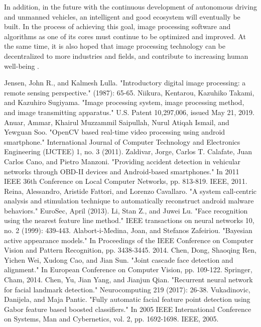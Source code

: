 \documentclass[12pt, a4paper]{article}
\begin{document}
In addition, in the future with the continuous development of autonomous driving and unmanned vehicles, an intelligent and good ecosystem will eventually be built. In the process of achieving this goal, image processing software and algorithms as one of its cores must continue to be optimized and improved. At the same time, it is also hoped that image processing technology can be decentralized to more industries and fields, and contribute to increasing human well-being .

\begin{thebibliography}{9}
 Jensen, John R., and Kalmesh Lulla. "Introductory digital image processing: a remote sensing perspective." (1987): 65-65.
 Niikura, Kentarou, Kazuhiko Takami, and Kazuhiro Sugiyama. "Image processing system, image processing method, and image transmitting apparatus." U.S. Patent 10,297,006, issued May 21, 2019.
 Anuar, Ammar, Khairul Muzzammil Saipullah, Nurul Atiqah Ismail, and Yewguan Soo. "OpenCV based real-time video processing using android smartphone." International Journal of Computer Technology and Electronics Engineering (IJCTEE) 1, no. 3 (2011).
 Zaldivar, Jorge, Carlos T. Calafate, Juan Carlos Cano, and Pietro Manzoni. "Providing accident detection in vehicular networks through OBD-II devices and Android-based smartphones." In 2011 IEEE 36th Conference on Local Computer Networks, pp. 813-819. IEEE, 2011.
 Reina, Alessandro, Aristide Fattori, and Lorenzo Cavallaro. "A system call-centric analysis and stimulation technique to automatically reconstruct android malware behaviors." EuroSec, April (2013).
 Li, Stan Z., and Juwei Lu. "Face recognition using the nearest feature line method." IEEE transactions on neural networks 10, no. 2 (1999): 439-443.
 Alabort-i-Medina, Joan, and Stefanos Zafeiriou. "Bayesian active appearance models." In Proceedings of the IEEE Conference on Computer Vision and Pattern Recognition, pp. 3438-3445. 2014.
 Chen, Dong, Shaoqing Ren, Yichen Wei, Xudong Cao, and Jian Sun. "Joint cascade face detection and alignment." In European Conference on Computer Vision, pp. 109-122. Springer, Cham, 2014.
 Chen, Yu, Jian Yang, and Jianjun Qian. "Recurrent neural network for facial landmark detection." Neurocomputing 219 (2017): 26-38.
 Vukadinovic, Danijela, and Maja Pantic. "Fully automatic facial feature point detection using Gabor feature based boosted classifiers." In 2005 IEEE International Conference on Systems, Man and Cybernetics, vol. 2, pp. 1692-1698. IEEE, 2005.

\end{thebibliography}
\end{document}
